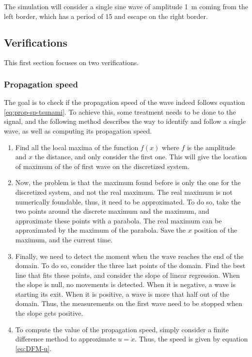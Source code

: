 \documentclass[a4paper,12pt,twoside]{article}
\begin{document}
      The simulation will consider a single sine wave of amplitude \SI{1}{\meter} coming from the left border, which has a period of \SI{15}{\min} and escape on the right border.\\

      \subsection{Verifications}
      This first section focuses on two verifications.

      \subsubsection{Propagation speed}
        The goal is to check if the propagation speed of the wave indeed follows equation \eqref{eq:prop-sp-tsunami}.
        To achieve this, some treatment needs to be done to the signal, and the following method describes the way to identify and follow a single wave, as well as computing its propagation speed.
        \begin{enumerate}
          \item Find all the local maxima of the function $f(x)$ where $f$ is the amplitude and $x$ the distance, and only consider the first one.
          This will give the location of maximum of the of first wave on the discretized system.
          \item Now, the problem is that the maximum found before is only the one for the discretized system, and not the real maximum.
          The real maximum is not numerically foundable, thus, it need to be approximated.
          To do so, take the two points around the discrete maximum and the maximum, and approximate these points with a parabola.
          The real maximum can be approximated by the maximum of the parabola.
          Save the $x$ position of the maximum, and the current time.
          \item Finally, we need to detect the moment when the wave reaches the end of the domain.
          To do so, consider the three last points of the domain.
          Find the best line that fits these points, and consider the slope of linear regression.
          When the slope is null, no movements is detected.
          When it is negative, a wave is starting its exit.
          When it is positive, a wave is more that half out of the domain.
          Thus, the measurements on the first wave need to be stopped when the slope gets positive.
          \item To compute the value of the propagation speed, simply consider a finite difference method to approximate $u=\dot{x}$.
          Thus, the speed is given by equation \eqref{eq:DFM-u}.
        \end{enumerate}
\end{document}

